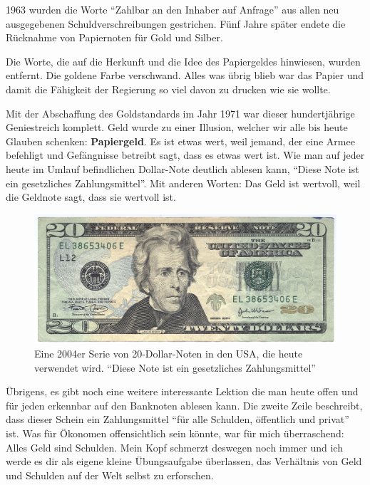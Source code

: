 1963 wurden die Worte \enquote{Zahlbar an den Inhaber auf Anfrage} aus allen neu
ausgegebenen Schuldverschreibungen gestrichen. Fünf Jahre später endete die
Rücknahme von Papiernoten für Gold und Silber.

Die Worte, die auf die Herkunft und die Idee des Papiergeldes hinwiesen, wurden
entfernt. Die goldene Farbe verschwand. Alles was übrig blieb war das Papier und
damit die Fähigkeit der Regierung so viel davon zu drucken wie sie wollte.

Mit der Abschaffung des Goldstandards im Jahr 1971 war dieser hundertjährige
Geniestreich komplett. Geld wurde zu einer Illusion, welcher wir alle bis heute
Glauben schenken: \textbf{Papiergeld}. Es ist etwas wert, weil jemand, der
eine Armee befehligt und Gefängnisse betreibt sagt, dass es etwas wert ist. Wie
man auf jeder heute im Umlauf befindlichen Dollar-Note deutlich ablesen kann,
\enquote{Diese Note ist ein gesetzliches Zahlungsmittel}. Mit anderen Worten:
Das Geld ist wertvoll, weil die Geldnote sagt, dass sie wertvoll ist.

\begin{figure}
  \centering
  \includegraphics{assets/images/us-dollar-2004.jpg}
  \caption{Eine 2004er Serie von 20-Dollar-Noten in den USA, die heute verwendet
  wird. \enquote{Diese Note ist ein gesetzliches Zahlungsmittel}}
  \label{fig:us-dollar-2004}
\end{figure}

Übrigens, es gibt noch eine weitere interessante Lektion die man heute offen und
für jeden erkennbar auf den Banknoten ablesen kann. Die zweite Zeile beschreibt,
dass dieser Schein ein Zahlungsmittel \enquote{für alle Schulden, öffentlich und
privat} ist. Was für Ökonomen offensichtlich sein könnte, war für mich
überraschend: Alles Geld sind Schulden. Mein Kopf schmerzt deswegen noch immer
und ich werde es dir als eigene kleine Übungsaufgabe überlassen, das Verhältnis
von Geld und Schulden auf der Welt selbst zu erforschen.

